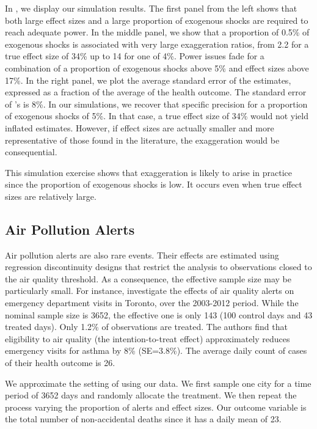 \documentclass[12pt]{article}
\begin{document}
            In , we display our simulation results. The first panel from the left shows that both large effect sizes and a large proportion of exogenous shocks are required to reach adequate power. In the middle panel, we show that a proportion of 0.5\% of exogenous shocks is associated with very large exaggeration ratios, from 2.2 for a true effect size of 34\% up to 14 for one of 4\%. Power issues fade for a combination of a proportion of exogenous shocks above 5\% and effect sizes above 17\%. In the right panel, we plot the average standard error of the estimates, expressed as a fraction of the average of the health outcome. The standard error of \cite{bauernschuster_when_2017}'s is 8\%. In our simulations, we recover that specific precision for a proportion of exogenous shocks of 5\%. In that case, a true effect size of 34\% would not yield inflated estimates. However, if effect sizes are actually smaller and more representative of those found in the literature, the exaggeration would be consequential.
            
            This simulation exercise shows that exaggeration is likely to arise in practice since the proportion of exogenous shocks is low. It occurs even when true effect sizes are relatively large.
        
        \subsection*{Air Pollution Alerts}
            
            Air pollution alerts are also rare events. Their effects are estimated using regression discontinuity designs that restrict the analysis to observations closed to the air quality threshold. As a consequence, the effective sample size may be particularly small. For instance, \cite{chen_effect_2018} investigate the effects of air quality alerts on emergency department visits in Toronto, over the 2003-2012 period. While the nominal sample size is 3652, the effective one is only 143 (100 control days and 43 treated days). Only 1.2\% of observations are treated. The authors find that eligibility to air quality (the intention-to-treat effect) approximately reduces emergency visits for asthma by 8\% (SE=3.8\%). The average daily count of cases of their health outcome is 26.
        
            We approximate the setting of \cite{chen_effect_2018} using our data. We first sample one city for a time period of 3652 days and randomly allocate the treatment. We then repeat the process varying the proportion of alerts and effect sizes. Our outcome variable is the total number of non-accidental deaths since it has a daily mean of 23.
            
\end{document}
